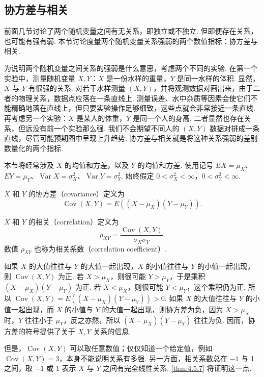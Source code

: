 \subsection{协方差与相关}\label{sec:4.5}
前面几节讨论了两个随机变量之间有无关系，即独立或不独立. 但即便存在关系，也可能有强有弱. 本节讨论度量两个随机变量关系强弱的两个数值指标：协方差与相关.

为说明两个随机变量之间关系的强弱是什么意思，考虑两个不同的实验. 在第一个实验中，测量随机变量 $X,Y$：$X$ 是一份水样的重量，$Y$ 是同一水样的体积. 显然，$X$ 与 $Y$ 有很强的关系. 对若干水样测量 $(X,Y)$，并将观测数据对画出来，由于二者的物理关系，数据点应落在一条直线上. 测量误差、水中杂质等因素会使它们不能精确地落在直线上，但只要实验操作足够细致，这些点就会非常接近一条直线. 再考虑另一个实验：$X$ 是某人的体重，$Y$ 是同一个人的身高. 二者显然也存在关系，但远没有前一个实验那么强. 我们不会期望不同人的 $(X,Y)$ 数据对排成一条直线，尽管可能预期图中呈现上升趋势. 协方差与相关就是将这种关系强弱的差别数量化的两个指标.

本节将经常涉及 $X$ 的均值和方差，以及 $Y$ 的均值和方差. 使用记号 $EX=\mu_X$、$EY=\mu_Y$、$\operatorname{Var}X=\sigma_X^2$、$\operatorname{Var}Y=\sigma_Y^2$. 始终假定 $0<\sigma_X^2<\infty$，$0<\sigma_Y^2<\infty$.
\begin{definition}\label{def:4.5.1}
$X$ 和 $Y$ 的协方差（covariance）定义为
$$\operatorname{Cov}(X,Y)=E((X-\mu_X)(Y-\mu_Y)).$$
\end{definition}

\begin{definition}\label{def:4.5.2}
$X$ 和 $Y$ 的相关（correlation）定义为
$$\rho_{XY}=\frac{\operatorname{Cov}(X,Y)}{\sigma_X\sigma_Y}.$$
数值 $\rho_{XY}$ 也称为相关系数（correlation coefficient）.
\end{definition}
如果 $X$ 的大值往往与 $Y$ 的大值一起出现，$X$ 的小值往往与 $Y$ 的小值一起出现，则 $\operatorname{Cov}(X,Y)$ 为正. 若 $X>\mu_X$，则很可能 $Y>\mu_Y$，于是乘积 $(X-\mu_X)(Y-\mu_Y)$ 为正. 若 $X<\mu_X$，则很可能 $Y<\mu_Y$，这个乘积仍为正. 所以 $\operatorname{Cov}(X,Y)=E((X-\mu_X)(Y-\mu_Y))>0$. 如果 $X$ 的大值往往与 $Y$ 的小值一起出现，而 $X$ 的小值与 $Y$ 的大值一起出现，则协方差为负，因为 $X>\mu_X$ 时，$Y$ 往往小于 $\mu_Y$，反之亦然，所以 $(X-\mu_X)(Y-\mu_Y)$ 往往为负. 因而，协方差的符号提供了关于 $X,Y$ 关系的信息.

但是，$\operatorname{Cov}(X,Y)$ 可以取任意数值；仅仅知道一个给定值，例如 $\operatorname{Cov}(X,Y)=3$，本身不能说明关系有多强. 另一方面，相关系数总在 $-1$ 与 1 之间，取 $-1$ 或 1 表示 $X$ 与 $Y$ 之间有完全线性关系. \autoref{thm:4.5.7} 将证明这一点.

